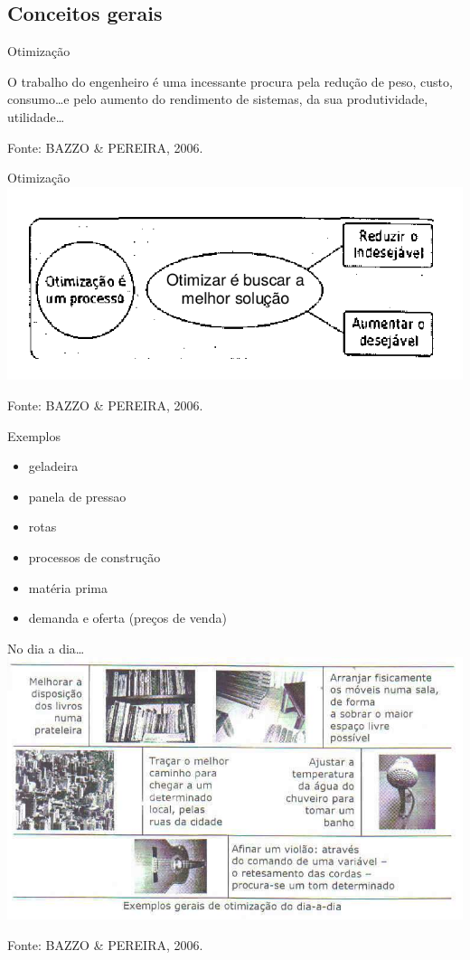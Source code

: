 \documentclass{beamer}
\begin{document}
\subsection{Conceitos gerais}

\begin{frame}{Otimização}
  \begin{definition}
    O trabalho do engenheiro é uma incessante procura pela redução de
    peso, custo, consumo\ldots e pelo aumento do rendimento de sistemas,
    da sua produtividade, utilidade\ldots
  \end{definition}

\vfill
Fonte: BAZZO \& PEREIRA, 2006.
\end{frame}

\begin{frame}{Otimização}
  \centering
  \includegraphics[width=.9\textwidth]{otimizacao/otimizacao}

\vfill
Fonte: BAZZO \& PEREIRA, 2006.
\end{frame}

\begin{frame}{Exemplos}
  \begin{itemize}
  \item geladeira
  \item panela de pressao
  \item rotas
  \item processos de construção
  \item matéria prima
  \item demanda e oferta (preços de venda)
  \end{itemize}
\end{frame}

\begin{frame}{No dia a dia\ldots}
  \centering
  \includegraphics[width=.9\textwidth]{otimizacao/dia_a_dia}

\vfill
Fonte: BAZZO \& PEREIRA, 2006.
\end{frame}
\end{document}
